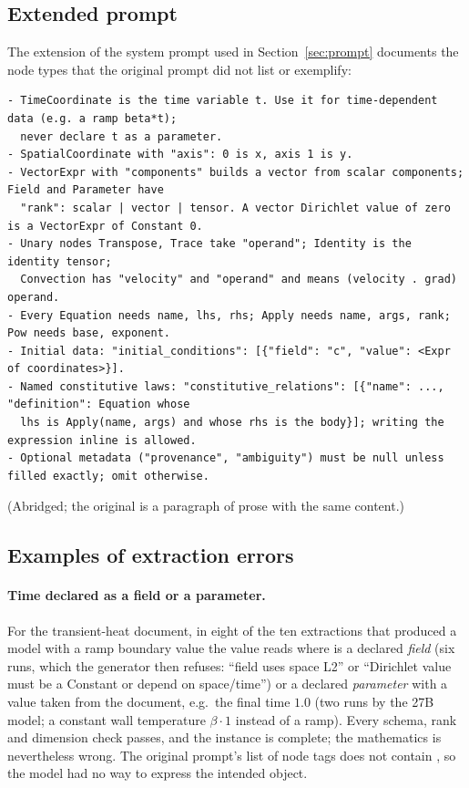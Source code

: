 \subsection{Extended prompt}
The extension of the system prompt used in Section~\ref{sec:prompt} documents the node types that the original prompt did not list or exemplify:
\begin{lstlisting}
- TimeCoordinate is the time variable t. Use it for time-dependent data (e.g. a ramp beta*t);
  never declare t as a parameter.
- SpatialCoordinate with "axis": 0 is x, axis 1 is y.
- VectorExpr with "components" builds a vector from scalar components; Field and Parameter have
  "rank": scalar | vector | tensor. A vector Dirichlet value of zero is a VectorExpr of Constant 0.
- Unary nodes Transpose, Trace take "operand"; Identity is the identity tensor;
  Convection has "velocity" and "operand" and means (velocity . grad) operand.
- Every Equation needs name, lhs, rhs; Apply needs name, args, rank; Pow needs base, exponent.
- Initial data: "initial_conditions": [{"field": "c", "value": <Expr of coordinates>}].
- Named constitutive laws: "constitutive_relations": [{"name": ..., "definition": Equation whose
  lhs is Apply(name, args) and whose rhs is the body}]; writing the expression inline is allowed.
- Optional metadata ("provenance", "ambiguity") must be null unless filled exactly; omit otherwise.
\end{lstlisting}
(Abridged; the original is a paragraph of prose with the same content.)

\subsection{Examples of extraction errors}
\paragraph{Time declared as a field or a parameter.} For the transient-heat document, in eight of the ten extractions that produced a model with a ramp boundary value the value reads  where  is a declared \emph{field} (six runs, which the generator then refuses: ``field  uses space L2'' or ``Dirichlet value must be a Constant or depend on space/time'') or a declared \emph{parameter} with a value taken from the document, e.g.\ the final time $1.0$ (two runs by the 27B model; a constant wall temperature $\beta\cdot1$ instead of a ramp). Every schema, rank and dimension check passes, and the instance is complete; the mathematics is nevertheless wrong. The original prompt's list of node tags does not contain , so the model had no way to express the intended object.

